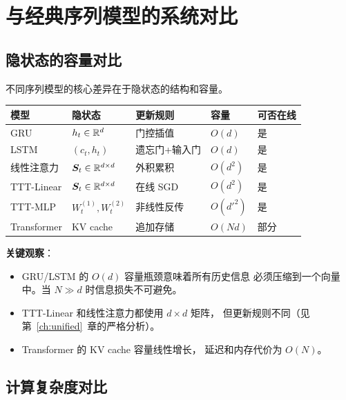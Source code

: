 \section{与经典序列模型的系统对比}
\label{sec:ttt_layers_comparison}

\subsection*{隐状态的容量对比}

不同序列模型的核心差异在于隐状态的结构和容量。

\begin{center}
\begin{tabular}{p{2.5cm} p{2cm} p{3cm} p{2cm} p{2.5cm}}
\toprule
\textbf{模型}
& \textbf{隐状态}
& \textbf{更新规则}
& \textbf{容量}
& \textbf{可否在线} \\
\midrule
GRU
& $h_t \in \mathbb{R}^d$
& 门控插值
& $O(d)$
& 是 \\
LSTM
& $(c_t, h_t)$
& 遗忘门+输入门
& $O(d)$
& 是 \\
线性注意力
& $\boldsymbol{S}_t \in \mathbb{R}^{d \times d}$
& 外积累积
& $O(d^2)$
& 是 \\
TTT-Linear
& $\boldsymbol{S}_t \in \mathbb{R}^{d \times d}$
& 在线 SGD
& $O(d^2)$
& 是 \\
TTT-MLP
& $W^{(1)}_t, W^{(2)}_t$
& 非线性反传
& $O(d'^2)$
& 是 \\
Transformer
& KV cache
& 追加存储
& $O(Nd)$
& 部分 \\
\bottomrule
\end{tabular}
\end{center}

\textbf{关键观察}：
\begin{itemize}
  \item GRU/LSTM 的 $O(d)$ 容量瓶颈意味着所有历史信息
    必须压缩到一个向量中。当 $N \gg d$ 时信息损失不可避免。
  \item TTT-Linear 和线性注意力都使用 $d \times d$ 矩阵，
    但更新规则不同（见第~\ref{ch:unified}~章的严格分析）。
  \item Transformer 的 KV cache 容量线性增长，
    延迟和内存代价为 $O(N)$。
\end{itemize}

\subsection*{计算复杂度对比}

